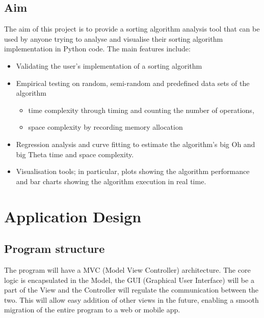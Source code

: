 \documentclass{article}
\begin{document}
        \subsection{Aim} 
            The aim of this project is to provide a sorting algorithm analysis tool that can be used by anyone trying to analyse and visualise their sorting algorithm implementation in Python code. The main features include:
            \begin{itemize}
            \item Validating the user's implementation of a sorting algorithm
            \item Empirical testing on random, semi-random and predefined data sets of the algorithm
                \begin{itemize}
                    \item time complexity through timing and counting the number of operations,
                    \item space complexity by recording memory allocation
                \end{itemize}
            \item Regression analysis and curve fitting to estimate the algorithm's big Oh and big Theta time and space complexity.
            \item Visualisation tools; in particular, plots showing the algorithm performance and bar charts showing the algorithm execution in real time.
            \end{itemize}

    \section{Application Design}
        \subsection{Program structure}
            The program will have a MVC (Model View Controller) architecture. The core logic is encapsulated in the Model, the GUI (Graphical User Interface) will be a part of the View and the Controller will regulate the communication between the two. This will allow easy addition of other views in the future, enabling a smooth migration of the entire program to a web or mobile app. \\
        
\end{document}
